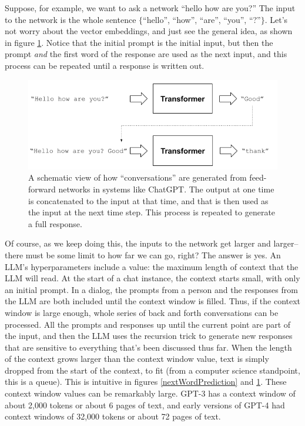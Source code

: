 Suppose, for example, we want to ask a network ``hello how are you?'' The input
to the network is the whole sentence $\{$``hello'', ``how'', ``are'', ``you'',
``?''$\}$. Let's  not worry about the vector embeddings, and just see the
general idea, as shown in figure \ref{gptRecursedInputs}. Notice that the
initial prompt is the initial input, but then the prompt \emph{and} the first
word of the response are used as the next input, and this process can be
repeated until a response is written out.
  
\begin{figure}[ht]
\centering
\includegraphics[scale=.7]{./images/gptRecursedInputs.png}
\caption[Jeff Yoshimi]{A schematic view of how ``conversations'' are generated
from feed-forward networks in systems like ChatGPT. The output at one time is
concatenated to the input at that time, and that is then used as the input at
the next time step. This process is repeated to generate a full response.
}
\label{gptRecursedInputs}
\end{figure}

Of course, as we keep doing this, the inputs to the network get larger and
larger--there must be some limit to how far we can go, right? The answer is
yes. An LLM's hyperparameters include a  value: the
maximum length of context that the LLM will read. At the start of a chat
instance, the context starts small, with only an initial prompt. In a dialog,
the prompts from a person and the responses from the LLM are both included
until the context window is filled. Thus, if the context window is large
enough, whole series of back and forth conversations can be processed. All the
prompts and responses up until the current point are part of the input, and
then the LLM uses the recursion trick to generate new responses that are
sensitive to everything that's been discussed thus far. When the length of the
context grows larger than the context window value, text is simply dropped from
the start of the context, to fit (from a computer science standpoint, this is a
queue). This is intuitive in figures \ref{nextWordPrediction} and
\ref{gptRecursedInputs}. These context window values can be remarkably large.
GPT-3 has a context window of about 2,000 tokens or about 6 pages of text, and
early versions of GPT-4 had context windows of 32,000 tokens or about 72 pages
of text.

